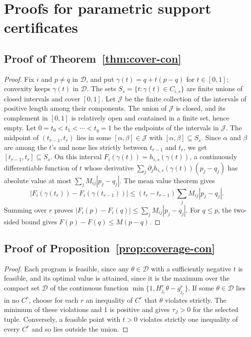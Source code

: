 \section{Proofs for parametric support certificates}\label{sec:parametric-proofs}

\subsection{Proof of Theorem~\ref{thm:cover-con}}\label{sec:parametric-proofs-cover}

\begin{proof}
Fix $i$ and $p\ne q$ in $\mathcal D$, and put $\gamma(t)=q+t(p-q)$ for
$t\in[0,1]$; convexity keeps $\gamma(t)$ in $\mathcal D$. The sets
$S_s=\{t:\gamma(t)\in C_{i,s}\}$ are finite unions of closed intervals and
cover $[0,1]$. Let $\mathcal J$ be the finite collection of the intervals
of positive length among their components. The union of $\mathcal J$ is
closed, and its complement in $[0,1]$ is relatively open and contained in a
finite set, hence empty. Let $0=t_0<t_1<\cdots<t_q=1$ be the endpoints of
the intervals in $\mathcal J$. The midpoint of $(t_{r-1},t_r)$ lies in some
$[\alpha,\beta]\in\mathcal J$ with $[\alpha,\beta]\subseteq S_s$. Since
$\alpha$ and $\beta$ are among the $t$'s and none lies strictly between
$t_{r-1}$ and $t_r$, we get $[t_{r-1},t_r]\subseteq S_s$. On this interval
$F_i(\gamma(t))=h_{i,s}(\gamma(t))$, a continuously differentiable function
of $t$ whose derivative
$\sum_j\partial_jh_{i,s}(\gamma(t))(p_j-q_j)$ has absolute value at most
$\sum_jM_{ij}|p_j-q_j|$. The mean value theorem gives
\[
 |F_i(\gamma(t_r))-F_i(\gamma(t_{r-1}))|
 \le(t_r-t_{r-1})\sum_jM_{ij}|p_j-q_j|.
\]
Summing over $r$ proves $|F_i(p)-F_i(q)|\le\sum_jM_{ij}|p_j-q_j|$. For
$q\le p$, the two-sided bound gives $F(p)-F(q)\le M(p-q)$.
\end{proof}

\subsection{Proof of Proposition~\ref{prop:coverage-con}}\label{sec:parametric-proofs-coverage}

\begin{proof}
Each program is feasible, since any $\theta\in\mathcal D$ with a
sufficiently negative $t$ is feasible, and its optimal value is attained,
since it is the maximum over the compact set $\mathcal D$ of the continuous
function $\min\{1,H^r_{j_r}\theta-g^r_{j_r}\}$. If some
$\theta\in\mathcal D$ lies in no $C^r$, choose for each $r$ an inequality
of $C^r$ that $\theta$ violates strictly. The minimum of these violations
and $1$ is positive and gives $\tau_J>0$ for the selected tuple.
Conversely, a feasible point with $t>0$ violates strictly one inequality of
every $C^r$ and so lies outside the union.
\end{proof}
